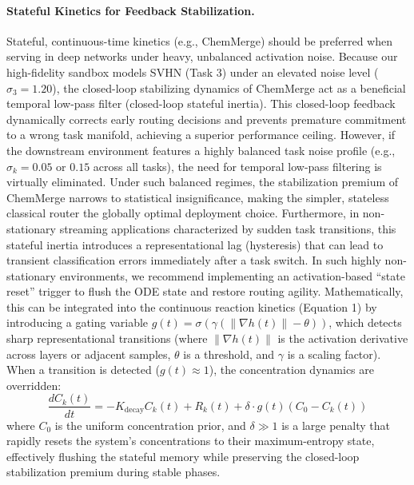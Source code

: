 \paragraph{Stateful Kinetics for Feedback Stabilization.}
Stateful, continuous-time kinetics (e.g., ChemMerge) should be preferred when serving in deep networks under heavy, unbalanced activation noise. Because our high-fidelity sandbox models SVHN (Task 3) under an elevated noise level ($\sigma_3 = 1.20$), the closed-loop stabilizing dynamics of ChemMerge act as a beneficial temporal low-pass filter (closed-loop stateful inertia). This closed-loop feedback dynamically corrects early routing decisions and prevents premature commitment to a wrong task manifold, achieving a superior performance ceiling. However, if the downstream environment features a highly balanced task noise profile (e.g., $\sigma_k = 0.05$ or $0.15$ across all tasks), the need for temporal low-pass filtering is virtually eliminated. Under such balanced regimes, the stabilization premium of ChemMerge narrows to statistical insignificance, making the simpler, stateless classical router the globally optimal deployment choice. Furthermore, in non-stationary streaming applications characterized by sudden task transitions, this stateful inertia introduces a representational lag (hysteresis) that can lead to transient classification errors immediately after a task switch. In such highly non-stationary environments, we recommend implementing an activation-based ``state reset'' trigger to flush the ODE state and restore routing agility. Mathematically, this can be integrated into the continuous reaction kinetics (Equation 1) by introducing a gating variable $g(t) = \sigma(\gamma (\|\nabla h(t)\| - \theta))$, which detects sharp representational transitions (where $\|\nabla h(t)\|$ is the activation derivative across layers or adjacent samples, $\theta$ is a threshold, and $\gamma$ is a scaling factor). When a transition is detected ($g(t) \approx 1$), the concentration dynamics are overridden:
\begin{equation}
\frac{d C_k(t)}{dt} = - K_{\text{decay}} C_k(t) + R_k(t) + \delta \cdot g(t) \left( C_{0} - C_k(t) \right)
\end{equation}
where $C_0$ is the uniform concentration prior, and $\delta \gg 1$ is a large penalty that rapidly resets the system's concentrations to their maximum-entropy state, effectively flushing the stateful memory while preserving the closed-loop stabilization premium during stable phases.

